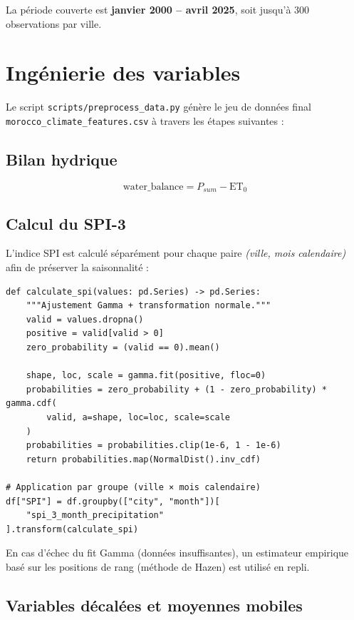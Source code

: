 \documentclass[12pt,a4paper]{report}
\begin{document}
La période couverte est \textbf{janvier 2000 – avril 2025}, soit jusqu'à 300 observations par ville.

\section{Ingénierie des variables}

Le script \texttt{scripts/preprocess\_data.py} génère le jeu de données final \texttt{morocco\_climate\_features.csv} à travers les étapes suivantes :

\subsection{Bilan hydrique}
\begin{equation}
    \text{water\_balance} = P_{sum} - \text{ET}_0
\end{equation}

\subsection{Calcul du SPI-3}

L'indice SPI est calculé séparément pour chaque paire \textit{(ville, mois calendaire)} afin de préserver la saisonnalité :

\begin{lstlisting}[style=pythonStyle, caption={Calcul du SPI-3 par ville et mois calendaire}]
def calculate_spi(values: pd.Series) -> pd.Series:
    """Ajustement Gamma + transformation normale."""
    valid = values.dropna()
    positive = valid[valid > 0]
    zero_probability = (valid == 0).mean()

    shape, loc, scale = gamma.fit(positive, floc=0)
    probabilities = zero_probability + (1 - zero_probability) * gamma.cdf(
        valid, a=shape, loc=loc, scale=scale
    )
    probabilities = probabilities.clip(1e-6, 1 - 1e-6)
    return probabilities.map(NormalDist().inv_cdf)

# Application par groupe (ville × mois calendaire)
df["SPI"] = df.groupby(["city", "month"])[
    "spi_3_month_precipitation"
].transform(calculate_spi)
\end{lstlisting}

En cas d'échec du fit Gamma (données insuffisantes), un estimateur empirique basé sur les positions de rang (méthode de Hazen) est utilisé en repli.

\subsection{Variables décalées et moyennes mobiles}
\end{document}
